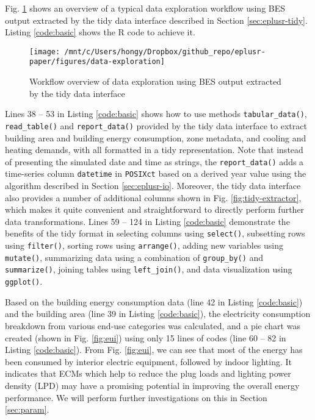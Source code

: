 \documentclass[3p, times]{elsarticle} %
\begin{document}
Fig. \ref{fig:flow-data} shows an overview of a typical data exploration
workflow using BES output extracted by the tidy data interface described in
Section \ref{sec:eplusr-tidy}. Listing \ref{code:basic} shows the R code to
achieve it.

\begin{figure}[!htb]
\texttt{[image: /mnt/c/Users/hongy/Dropbox/github\_repo/eplusr-paper/figures/data-exploration]} \caption{Workflow overview of data exploration using BES output extracted by the tidy data interface}\label{fig:flow-data}
\end{figure}

Lines 38 -- 53 in Listing \ref{code:basic} shows how to use methods
\texttt{tabular\_data()}, \texttt{read\_table()} and \texttt{report\_data()} provided by the tidy data
interface to extract building area and building energy consumption, zone
metadata, and cooling and heating demands, with all formatted in a tidy
representation. Note that instead of presenting the simulated date and time as
strings, the \texttt{report\_data()} adds a time-series column \texttt{datetime} in \texttt{POSIXct}
based on a derived year value using the algorithm described in Section
\ref{sec:eplusr-io}. Moreover, the tidy data interface also provides a number
of additional columns shown in Fig. \ref{fig:tidy-extractor}, which makes it
quite convenient and straightforward to directly perform further data
transformations. Lines 59 -- 124 in Listing \ref{code:basic} demonstrate the
benefits of the tidy format in selecting columns using \texttt{select()}, subsetting
rows using \texttt{filter()}, sorting rows using \texttt{arrange()}, adding new variables
using \texttt{mutate()}, summarizing data using a combination of \texttt{group\_by()} and
\texttt{summarize()}, joining tables using \texttt{left\_join()}, and data visualization using
\texttt{ggplot()}.

Based on the building energy consumption data (line 42 in Listing
\ref{code:basic}) and the building area (line 39 in Listing \ref{code:basic}),
the electricity consumption breakdown from various end-use categories was
calculated, and a pie chart was created (shown in Fig. \ref{fig:eui}) using
only 15 lines of codes (line 60 -- 82 in Listing \ref{code:basic}). From Fig.
\ref{fig:eui}, we can see that most of the energy has been consumed by interior
electric equipment, followed by indoor lighting. It indicates that ECMs which
help to reduce the plug loads and lighting power density (LPD) may have a
promising potential in improving the overall energy performance. We will perform
further investigations on this in Section \ref{sec:param}.
\end{document}
